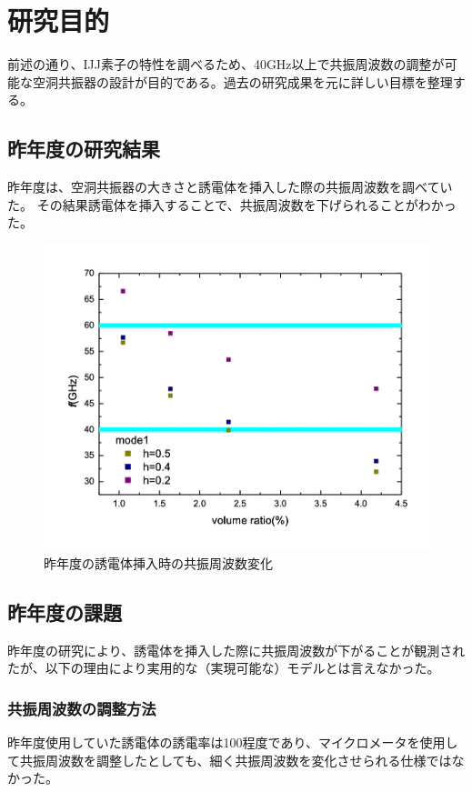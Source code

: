 \chapter{研究目的}
前述の通り、IJJ素子の特性を調べるため、40GHz以上で共振周波数の調整が可能な空洞共振器の設計が目的である。過去の研究成果を元に詳しい目標を整理する。

\section{昨年度の研究結果}
昨年度は、空洞共振器の大きさと誘電体を挿入した際の共振周波数を調べていた。\cite{わたなべ}
その結果誘電体を挿入することで、共振周波数を下げられることがわかった。

\vspace{10 mm}

\begin{figure}[h]
  \begin{center}
    \includegraphics[width=12cm]{./image/watanabe.png}
    \caption{昨年度の誘電体挿入時の共振周波数変化}
    \label{fig:Watanabe}
  \end{center}
\end{figure}

\section{昨年度の課題}
昨年度の研究により、誘電体を挿入した際に共振周波数が下がることが観測されたが、以下の理由により実用的な（実現可能な）モデルとは言えなかった。


\subsection*{共振周波数の調整方法}
昨年度使用していた誘電体の誘電率は100程度であり、マイクロメータを使用して共振周波数を調整したとしても、細く共振周波数を変化させられる仕様ではなかった。



